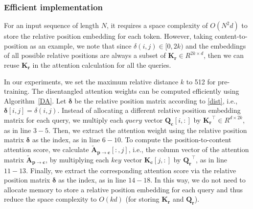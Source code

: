\subsubsection{Efficient implementation}
For an input sequence of length $N$, it requires a space complexity of $O(N^2d)$ \citep{shaw2018self,huang2018music,dai2019transformer} to store the relative position embedding for each token. 
However, taking content-to-position as an example, we note that since $\delta(i,j) \in [0,2k)$ and the embeddings of all possible relative positions are always a subset of $\bm{K_r} \in R^{2k \times d}$, then we can reuse $\bm{K_r}$ in the attention calculation for all the queries.

In our experiments, we set the maximum relative distance $k$ to 512 for pre-training.
The disentangled attention weights can be computed efficiently using Algorithm~\ref{DA}.
Let $\bm{\delta}$ be the relative position matrix according to \eqref{dist}, i.e., $\bm{\delta}[i,j]=\delta(i,j)$.
Instead of allocating a different relative position embedding matrix for each query, we multiply each $query$ vector $\bm{Q_c}[i,:]$ by $\bm{K_r}^\intercal \in R^{d \times 2k}$, as in line $3-5$. 
Then, we extract the attention weight using the relative position matrix $\bm{\delta}$ as the index, as in line $6-10$. 
To compute the position-to-content attention score, we  calculate $\bm{\tilde{A}_{p\rightarrow c}}[:,j]$, i.e., the column vector of the attention matrix $\bm{\tilde{A}_{p\rightarrow c}}$, by multiplying each $key$ vector $\bm{K_c}[j,:]$ by $\bm{Q_r}^\intercal$, as in line $11-13$. 
Finally, we extract the corresponding attention score via the relative position matrix $\bm{\delta}$ as the index, as in line $14-18$. 
In this way, we do not need to allocate memory to store a relative position embedding for each query and thus reduce the space complexity to $O(kd)$ (for storing $\bm{K_r}$ and $\bm{Q_r}$). 

